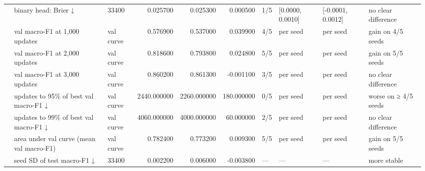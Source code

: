 \begin{table}
\begin{tabular}{lllrrrllll}
 & binary head: Brier ↓ & 33400 & 0.025700 & 0.025300 & 0.000500 & 1/5 & [0.0000, 0.0010] & [-0.0001, 0.0012] & no clear difference \\
 & val macro-F1 at 1,000 updates & val curve & 0.576900 & 0.537000 & 0.039900 & 4/5 & per seed & per seed & gain on 4/5 seeds \\
 & val macro-F1 at 2,000 updates & val curve & 0.818600 & 0.793800 & 0.024800 & 5/5 & per seed & per seed & gain on 5/5 seeds \\
 & val macro-F1 at 3,000 updates & val curve & 0.860200 & 0.861300 & -0.001100 & 3/5 & per seed & per seed & no clear difference \\
 & updates to 95\% of best val macro-F1 ↓ & val curve & 2440.000000 & 2260.000000 & 180.000000 & 0/5 & per seed & per seed & worse on ≥ 4/5 seeds \\
 & updates to 99\% of best val macro-F1 ↓ & val curve & 4060.000000 & 4000.000000 & 60.000000 & 2/5 & per seed & per seed & no clear difference \\
 & area under val curve (mean val macro-F1) & val curve & 0.782400 & 0.773200 & 0.009300 & 5/5 & per seed & per seed & gain on 5/5 seeds \\
 & seed SD of test macro-F1 ↓ & 33400 & 0.002200 & 0.006000 & -0.003800 & — & — & — & more stable \\
\cline{1-10}
\bottomrule
\end{tabular}
\end{table}
